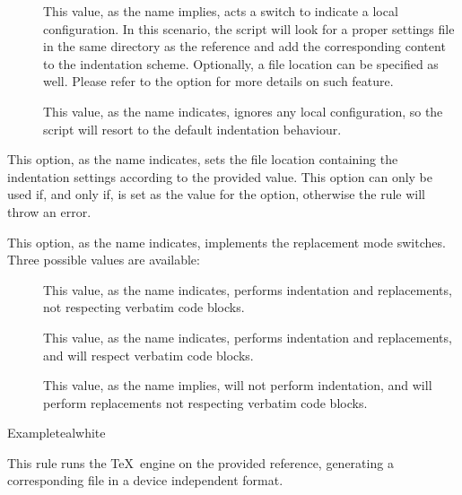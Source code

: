 \begin{description}
\begin{description}
\begin{description}
\item[] This value, as the name implies, acts a switch to indicate a local configuration. In this scenario, the script will look for a proper settings file in the same directory as the  reference and add the corresponding content to the indentation scheme. Optionally, a file location can be specified as well. Please refer to the  option for more details on such feature.

\item[] This value, as the name indicates, ignores any local configuration, so the script will resort to the default indentation behaviour.
\end{description}

\item[\abox{where}] This option, as the name indicates, sets the file location containing the indentation settings according to the provided value. This option can only be used if, and only if,  is set as the value for the  option, otherwise the rule will throw an error.

\item[\abox{replacement}] This option, as the name indicates, implements the replacement mode switches. Three possible values are available:

\begin{description}
\item[] This value, as the name indicates, performs indentation and replacements, not respecting verbatim code blocks.

\item[] This value, as the name indicates, performs indentation and replacements, and will respect verbatim code blocks.

\item[] This value, as the name implies, will not perform indentation, and will perform replacements not respecting verbatim code blocks.
\end{description}
\end{description}

\begin{codebox}{Example}{teal}{\icnote}{white}
\end{codebox}

\item[\rulebox{latex}{Marco Daniel, Paulo Cereda}] This rule runs the  \TeX\ engine on the provided  reference, generating a corresponding file in a device independent format.


\end{description}
